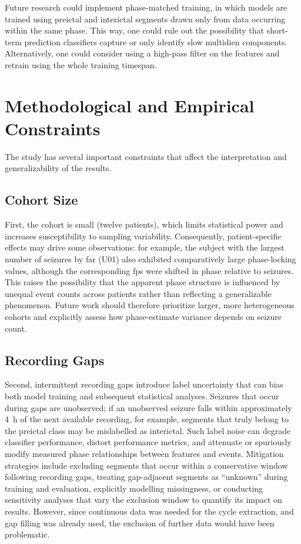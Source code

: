 Future research could implement phase-matched training, in which models are trained using preictal and interictal segments drawn only from data occurring within the same phase. 
This way, one could rule out the possibility that short-term prediction classifiers capture or only identify slow multidien components.
Alternatively, one could consider using a high-pass filter on the features and retrain using the whole training timespan.


\section{Methodological and Empirical Constraints}
The study has several important constraints that affect the interpretation and generalizability of the results.

\subsection{Cohort Size}
First, the cohort is small (twelve patients), which limits statistical power and increases susceptibility to sampling variability.
Consequently, patient-specific effects may drive some observations: for example, the subject with the largest number of seizures by far (U01) also exhibited comparatively large phase-locking values, although the corresponding \glspl{fp} were shifted in phase relative to seizures.
This raises the possibility that the apparent phase structure is influenced by unequal event counts across patients rather than reflecting a generalizable phenomenon.
Future work should therefore prioritize larger, more heterogeneous cohorts and explicitly assess how phase-estimate variance depends on seizure count.

\subsection{Recording Gaps}
Second, intermittent recording gaps introduce label uncertainty that can bias both model training and subsequent statistical analyses.
Seizures that occur during gaps are unobserved; if an unobserved seizure falls within approximately \SI{4}{\hour} of the next available recording, for example, segments that truly belong to the preictal class may be mislabelled as interictal.
Such label noise can degrade classifier performance, distort performance metrics, and attenuate or spuriously modify measured phase relationships between features and events.
Mitigation strategies include excluding segments that occur within a conservative window following recording gaps, treating gap-adjacent segments as ``unknown'' during training and evaluation, explicitly modelling missingness, or conducting sensitivity analyses that vary the exclusion window to quantify its impact on results.
However, since continuous data was needed for the cycle extraction, and gap filling was already used, the exclusion of further data would have been problematic.

